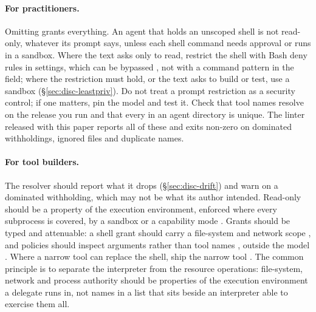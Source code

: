\paragraph{For practitioners.} Omitting  grants everything. An agent that holds an unscoped shell is not
read-only, whatever its prompt says, unless each shell command needs approval or runs in a sandbox. Where the text asks
only to read, restrict the shell with Bash deny rules in settings, which can be bypassed \citep{Chen2026Denylist}, not
with a command pattern in the  field; where the restriction must hold, or the text asks to build or test,
use a sandbox (\S\ref{sec:disc-leastpriv}). Do not treat a prompt restriction as a security control; if one matters, pin the model and
test it. Check that tool names resolve on the release you run and that every  in an agent directory is
unique. The linter released with this paper reports all of these and exits non-zero on dominated withholdings,
ignored files and duplicate names.

\paragraph{For tool builders.} The resolver should report what it drops (\S\ref{sec:disc-drift}) and warn on a
dominated withholding, which may not be what its author intended. Read-only should be a property of the execution
environment, enforced where every subprocess is covered, by a sandbox or a capability mode \citep{watson2010capsicum}.
Grants should be typed and attenuable: a shell grant should carry a file-system and network scope
\citep{moore2014shill}, and policies should inspect arguments rather than tool names \citep{shi2025progent}, outside
the model \citep{debenedetti2025defeating}. Where a narrow tool
can replace the shell, ship the narrow tool \citep{beurerkellner2025design}. The common principle is to separate the
interpreter from the resource operations: file-system, network and process authority should be properties of the
execution environment a delegate runs in, not names in a list that sits beside an interpreter able to exercise them
all.

